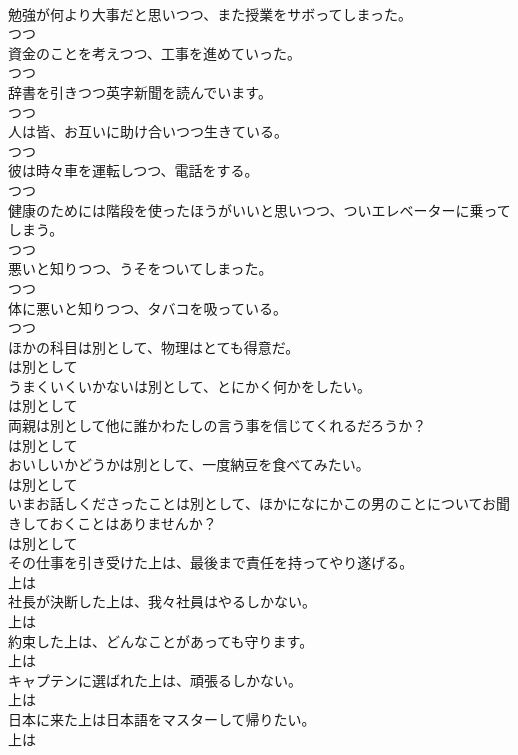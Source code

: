 \documentclass[8pt]{extreport}
\begin{document}
\begin{CJK}{UTF8}{min}
\\	勉強が何より大事だと思いつつ、また授業をサボってしまった。	
\\	つつ
\\	資金のことを考えつつ、工事を進めていった。	
\\	つつ
\\	辞書を引きつつ英字新聞を読んでいます。	
\\	つつ
\\	人は皆、お互いに助け合いつつ生きている。	
\\	つつ
\\	彼は時々車を運転しつつ、電話をする。	
\\	つつ
\\	健康のためには階段を使ったほうがいいと思いつつ、ついエレベーターに乗ってしまう。	
\\	つつ
\\	悪いと知りつつ、うそをついてしまった。	
\\	つつ
\\	体に悪いと知りつつ、タバコを吸っている。	
\\	つつ
\\	ほかの科目は別として、物理はとても得意だ。	
\\	は別として
\\	うまくいくいかないは別として、とにかく何かをしたい。	
\\	は別として
\\	両親は別として他に誰かわたしの言う事を信じてくれるだろうか？	
\\	は別として
\\	おいしいかどうかは別として、一度納豆を食べてみたい。	
\\	は別として
\\	いまお話しくださったことは別として、ほかになにかこの男のことについてお聞きしておくことはありませんか？	
\\	は別として
\\	その仕事を引き受けた上は、最後まで責任を持ってやり遂げる。	
\\	上は
\\	社長が決断した上は、我々社員はやるしかない。	
\\	上は
\\	約束した上は、どんなことがあっても守ります。	
\\	上は
\\	キャプテンに選ばれた上は、頑張るしかない。	
\\	上は
\\	日本に来た上は日本語をマスターして帰りたい。	
\\	上は

\end{CJK}
\end{document}
